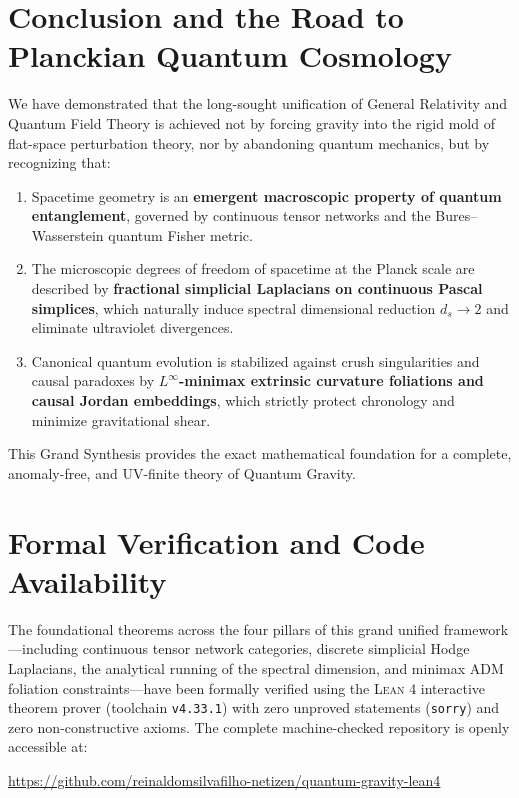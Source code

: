 \documentclass[11pt,a4paper,reqno]{amsart}
\theoremstyle{definition}
\numberwithin{equation}{section}
\begin{document}
\section{Conclusion and the Road to Planckian Quantum Cosmology}
\label{sec:conclusion}

We have demonstrated that the long-sought unification of General Relativity and Quantum Field Theory is achieved not by forcing gravity into the rigid mold of flat-space perturbation theory, nor by abandoning quantum mechanics, but by recognizing that:
\begin{enumerate}
    \item Spacetime geometry is an \textbf{emergent macroscopic property of quantum entanglement}, governed by continuous tensor networks and the Bures--Wasserstein quantum Fisher metric.
    \item The microscopic degrees of freedom of spacetime at the Planck scale are described by \textbf{fractional simplicial Laplacians on continuous Pascal simplices}, which naturally induce spectral dimensional reduction $d_s \to 2$ and eliminate ultraviolet divergences.
    \item Canonical quantum evolution is stabilized against crush singularities and causal paradoxes by \textbf{$L^\infty$-minimax extrinsic curvature foliations and causal Jordan embeddings}, which strictly protect chronology and minimize gravitational shear.
\end{enumerate}

This Grand Synthesis provides the exact mathematical foundation for a complete, anomaly-free, and UV-finite theory of Quantum Gravity.

\section*{Formal Verification and Code Availability}
The foundational theorems across the four pillars of this grand unified framework---including continuous tensor network categories, discrete simplicial Hodge Laplacians, the analytical running of the spectral dimension, and minimax ADM foliation constraints---have been formally verified using the \textsc{Lean 4} interactive theorem prover (toolchain \texttt{v4.33.1}) with zero unproved statements (\texttt{sorry}) and zero non-constructive axioms. The complete machine-checked repository is openly accessible at:
\begin{center}
\url{https://github.com/reinaldomsilvafilho-netizen/quantum-gravity-lean4}
\end{center}
\end{document}
